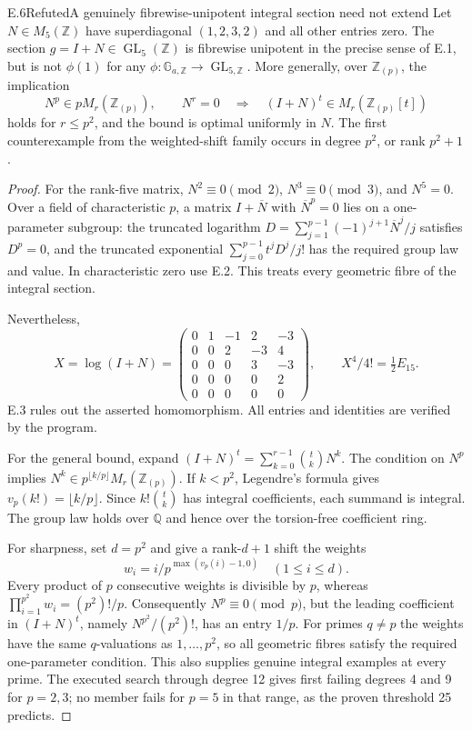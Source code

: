 \begin{statement}{E.6}{Refuted}{A genuinely fibrewise-unipotent integral section need not extend}
Let \(N\in M_5(\mathbb Z)\) have superdiagonal \((1,2,3,2)\) and all
other entries zero.  The section \(g=I+N\in\operatorname{GL}_5(\mathbb Z)\)
is fibrewise unipotent in the precise sense of E.1, but is not
\(\phi(1)\) for any \(\phi:\mathbb G_{a,\mathbb Z}\to
\operatorname{GL}_{5,\mathbb Z}\).  More generally, over
\(\mathbb Z_{(p)}\), the implication
\[
 N^p\in pM_r(\mathbb Z_{(p)}),\qquad N^r=0
 \quad\Longrightarrow\quad
 (I+N)^t\in M_r(\mathbb Z_{(p)}[t])
\]
holds for \(r\leq p^2\), and the bound is optimal uniformly in \(N\).
The first counterexample from the weighted-shift family occurs in
degree \(p^2\), or rank \(p^2+1\).
\end{statement}
\begin{proof}
For the rank-five matrix,
\(N^2\equiv0\pmod2\), \(N^3\equiv0\pmod3\), and \(N^5=0\).
Over a field of characteristic \(p\), a matrix \(I+\overline N\) with
\(\overline N^p=0\) lies on a one-parameter subgroup: the truncated
logarithm \(D=\sum_{j=1}^{p-1}(-1)^{j+1}\overline N^j/j\) satisfies
\(D^p=0\), and the truncated exponential \(\sum_{j=0}^{p-1}t^jD^j/j!\)
has the required group law and value.  In characteristic zero use E.2.
This treats every geometric fibre of the integral section.

Nevertheless,
\[
 X=\log(I+N)=
 \begin{pmatrix}
 0&1&-1&2&-3\\0&0&2&-3&4\\0&0&0&3&-3\\0&0&0&0&2\\0&0&0&0&0
 \end{pmatrix},
 \qquad X^4/4!=\tfrac12E_{15}.
\]
E.3 rules out the asserted homomorphism.  All entries and identities
are verified by the program.

For the general bound, expand
\((I+N)^t=\sum_{k=0}^{r-1}\binom tkN^k\).
The condition on \(N^p\) implies
\(N^k\in p^{\lfloor k/p\rfloor}M_r(\mathbb Z_{(p)})\).
If \(k<p^2\), Legendre's formula gives
\(v_p(k!)=\lfloor k/p\rfloor\).  Since \(k!\binom tk\) has integral
coefficients, each summand is integral.  The group law holds over
\(\mathbb Q\) and hence over the torsion-free coefficient ring.

For sharpness, set \(d=p^2\) and give a rank-\(d+1\) shift the weights
\[
                  w_i=i/p^{\max(v_p(i)-1,0)}\quad(1\leq i\leq d).
\]
Every product of \(p\) consecutive weights is divisible by \(p\),
whereas \(\prod_{i=1}^{p^2}w_i=(p^2)!/p\).  Consequently
\(N^p\equiv0\pmod p\), but the leading coefficient in
\((I+N)^t\), namely \(N^{p^2}/(p^2)!\), has an entry \(1/p\).
For primes \(q\ne p\) the weights have the same \(q\)-valuations as
\(1,\ldots,p^2\), so all geometric fibres satisfy the required
one-parameter condition.  This also supplies genuine integral
examples at every prime.  The executed search through degree 12 gives
first failing degrees 4 and 9 for \(p=2,3\); no member fails for
\(p=5\) in that range, as the proven threshold 25 predicts.
\end{proof}

